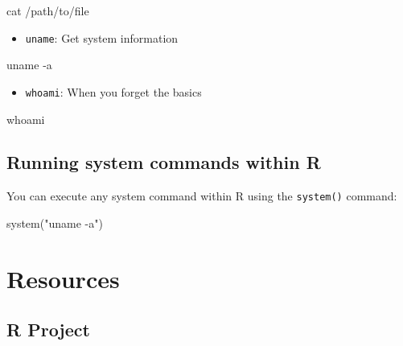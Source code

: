 \documentclass[
]{book}
\newenvironment{Shaded}{\begin{snugshade}}{\end{snugshade}}
\newcommand{\FunctionTok}[1]{\textcolor[rgb]{0.00,0.00,0.00}{#1}}
\newcommand{\NormalTok}[1]{#1}
\newcommand{\StringTok}[1]{\textcolor[rgb]{0.31,0.60,0.02}{#1}}
\providecommand{\tightlist}{%
  \setlength{\itemsep}{0pt}\setlength{\parskip}{0pt}}
\begin{document}
\begin{Shaded}
\begin{Highlighting}[]
\FunctionTok{cat}\NormalTok{ /path/to/file}
\end{Highlighting}
\end{Shaded}

\begin{itemize}
\tightlist
\item
  \texttt{uname}: Get system information
\end{itemize}

\begin{Shaded}
\begin{Highlighting}[]
\FunctionTok{uname}\NormalTok{ {-}a}
\end{Highlighting}
\end{Shaded}

\begin{itemize}
\tightlist
\item
  \texttt{whoami}: When you forget the basics
\end{itemize}

\begin{Shaded}
\begin{Highlighting}[]
\FunctionTok{whoami}
\end{Highlighting}
\end{Shaded}

\hypertarget{running-system-commands-within-r}{%
\section{Running system commands within R}\label{running-system-commands-within-r}}

You can execute any system command within R using the \texttt{system()} command:

\begin{Shaded}
\begin{Highlighting}[]
\FunctionTok{system}\NormalTok{(}\StringTok{"uname {-}a"}\NormalTok{)}
\end{Highlighting}
\end{Shaded}

\hypertarget{resources}{%
\chapter{Resources}\label{resources}}

\hypertarget{r-project}{%
\section{R Project}\label{r-project}}
\end{document}
